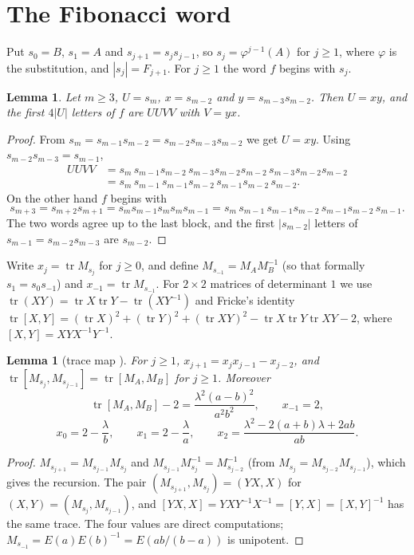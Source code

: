 \documentclass[11pt]{amsart}
\newtheorem{lemma}[theorem]{Lemma}
\theoremstyle{definition}
\newcommand{\tr}{\operatorname{tr}}
\begin{document}
\section{The Fibonacci word}

Put $s_0=B$, $s_1=A$ and $s_{j+1}=s_js_{j-1}$, so $s_j=\varphi^{j-1}(A)$ for $j\ge1$, where $\varphi$ is the
substitution, and $|s_j|=F_{j+1}$. For $j\ge1$ the word $f$ begins with $s_j$.

\begin{lemma}\label{lem:word}
Let $m\ge3$, $U=s_m$, $x=s_{m-2}$ and $y=s_{m-3}s_{m-2}$. Then $U=xy$, and the first $4|U|$ letters of $f$ are
$UUVV$ with $V=yx$.
\end{lemma}

\begin{proof}
From $s_m=s_{m-1}s_{m-2}=s_{m-2}s_{m-3}s_{m-2}$ we get $U=xy$. Using $s_{m-2}s_{m-3}=s_{m-1}$,
\begin{align*}
UUVV&=s_m\,s_{m-1}s_{m-2}\,s_{m-3}s_{m-2}s_{m-2}\,s_{m-3}s_{m-2}s_{m-2}\\
&=s_m\,s_{m-1}\,s_{m-1}s_{m-2}\,s_{m-1}s_{m-2}\,s_{m-2}.
\end{align*}
On the other hand $f$ begins with
\[
s_{m+3}=s_{m+2}s_{m+1}=s_ms_{m-1}s_ms_ms_{m-1}=s_m\,s_{m-1}\,s_{m-1}s_{m-2}\,s_{m-1}s_{m-2}\,s_{m-1}.
\]
The two words agree up to the last block, and the
first $|s_{m-2}|$ letters of $s_{m-1}=s_{m-2}s_{m-3}$ are $s_{m-2}$.
\end{proof}

Write $x_j=\tr M_{s_j}$ for $j\ge0$, and define $M_{s_{-1}}=M_AM_B^{-1}$ (so that formally $s_1=s_0s_{-1}$)
and $x_{-1}=\tr M_{s_{-1}}$. For $2\times2$ matrices of determinant $1$ we use
$\tr(XY)=\tr X\tr Y-\tr(XY^{-1})$ and Fricke's identity
$\tr[X,Y]=(\tr X)^2+(\tr Y)^2+(\tr XY)^2-\tr X\tr Y\tr XY-2$, where $[X,Y]=XYX^{-1}Y^{-1}$.

\begin{lemma}[trace map \cite{KKT}]\label{lem:trace}
For $j\ge1$, $x_{j+1}=x_jx_{j-1}-x_{j-2}$, and $\tr[M_{s_j},M_{s_{j-1}}]=\tr[M_A,M_B]$ for $j\ge1$. Moreover
\[
\tr[M_A,M_B]-2=\frac{\lambda^2(a-b)^2}{a^2b^2},\qquad x_{-1}=2,
\]
\[
x_0=2-\frac{\lambda}{b},\qquad x_1=2-\frac{\lambda}{a},\qquad x_2=\frac{\lambda^2-2(a+b)\lambda+2ab}{ab}.
\]
\end{lemma}

\begin{proof}
$M_{s_{j+1}}=M_{s_{j-1}}M_{s_j}$ and $M_{s_{j-1}}M_{s_j}^{-1}=M_{s_{j-2}}^{-1}$ (from
$M_{s_j}=M_{s_{j-2}}M_{s_{j-1}}$), which gives the recursion. The pair $(M_{s_{j+1}},M_{s_j})=(YX,X)$ for
$(X,Y)=(M_{s_j},M_{s_{j-1}})$, and $[YX,X]=YXY^{-1}X^{-1}=[Y,X]=[X,Y]^{-1}$ has the same trace. The four
values are direct computations; $M_{s_{-1}}=E(a)E(b)^{-1}=E(ab/(b-a))$ is unipotent.
\end{proof}
\end{document}
